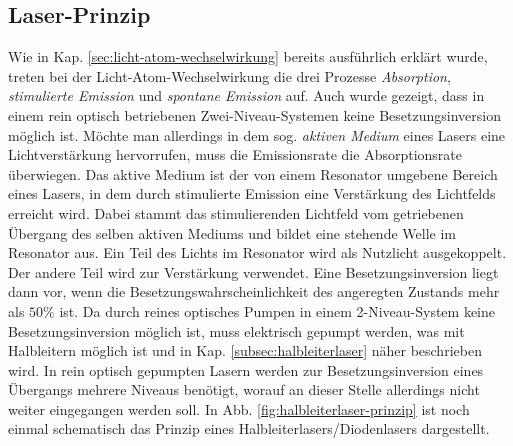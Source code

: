 \subsection{Laser-Prinzip}\label{subsec:laser-prinzip}
Wie in Kap. \ref{sec:licht-atom-wechselwirkung} bereits ausführlich erklärt
wurde, treten bei der Licht-Atom-Wechselwirkung die drei Prozesse
\textit{Absorption}, \textit{stimulierte Emission} und \textit{spontane Emission} auf. Auch wurde
gezeigt, dass in einem rein optisch betriebenen Zwei-Niveau-Systemen keine
Besetzungsinversion möglich ist.
Möchte man allerdings in dem sog. \textit{aktiven Medium} eines Lasers eine Lichtverstärkung
hervorrufen, muss die Emissionsrate die Absorptionsrate überwiegen. Das aktive Medium ist der von einem Resonator
umgebene Bereich eines Lasers, in dem durch stimulierte Emission eine
Verstärkung des Lichtfelds erreicht wird. Dabei stammt das stimulierenden
Lichtfeld vom getriebenen Übergang des selben aktiven Mediums und bildet eine
stehende Welle im Resonator aus. Ein Teil des Lichts im Resonator wird als
Nutzlicht ausgekoppelt. Der andere Teil wird zur Verstärkung verwendet. Eine
Besetzungsinversion liegt dann vor, wenn die Besetzungswahrscheinlichkeit des
angeregten Zustands mehr als $50\%$ ist.
Da durch reines optisches Pumpen in einem
2-Niveau-System keine Besetzungsinversion möglich ist, muss elektrisch gepumpt
werden, was mit Halbleitern möglich ist und in Kap.
\ref{subsec:halbleiterlaser} näher beschrieben wird. In rein optisch gepumpten
Lasern werden zur Besetzungsinversion eines Übergangs mehrere Niveaus benötigt,
worauf an dieser Stelle allerdings nicht weiter eingegangen werden soll. In Abb.
\ref{fig:halbleiterlaser-prinzip} ist noch einmal schematisch das Prinzip eines Halbleiterlasers/Diodenlasers dargestellt.
